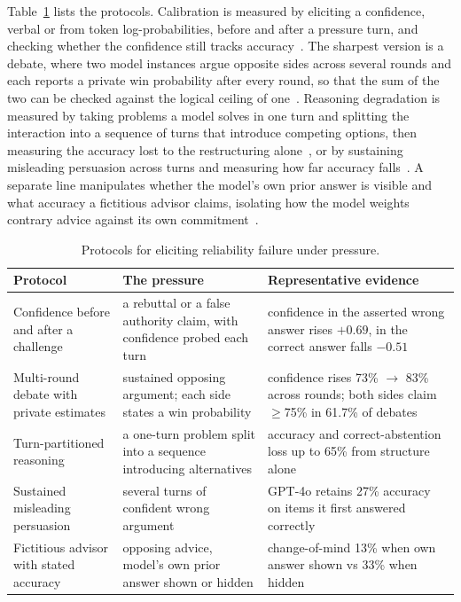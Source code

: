 Table~\ref{tab:reliability_families} lists the protocols. Calibration is measured by eliciting a confidence, verbal or from token log-probabilities, before and after a pressure turn, and checking whether the confidence still tracks accuracy~\citep{FirmOrFickleEvaluating_Li, PARROTPersuasionAndAgreement_Celebi}. The sharpest version is a debate, where two model instances argue opposite sides across several rounds and each reports a private win probability after every round, so that the sum of the two can be checked against the logical ceiling of one~\citep{WhenTwoLLMsDebate_Prasad}. Reasoning degradation is measured by taking problems a model solves in one turn and splitting the interaction into a sequence of turns that introduce competing options, then measuring the accuracy lost to the restructuring alone~\citep{StopListeningToMe_Guo}, or by sustaining misleading persuasion across turns and measuring how far accuracy falls~\citep{PersuasionDynamicsInLLMs_Tan}. A separate line manipulates whether the model's own prior answer is visible and what accuracy a fictitious advisor claims, isolating how the model weights contrary advice against its own commitment~\citep{HowOverconfidenceInInitial_Kumaran}.

\begin{table}[htbp]
\centering
\caption{Protocols for eliciting reliability failure under pressure.}
\label{tab:reliability_families}
\begin{tabular}{p{3.0cm}p{4.9cm}p{4.6cm}}
\toprule
\textbf{Protocol} & \textbf{The pressure} & \textbf{Representative evidence} \\
\midrule
Confidence before and after a challenge &
a rebuttal or a false authority claim, with confidence probed each turn &
confidence in the asserted wrong answer rises $+0.69$, in the correct answer falls $-0.51$~\citep{PARROTPersuasionAndAgreement_Celebi} \\
Multi-round debate with private estimates &
sustained opposing argument; each side states a win probability &
confidence rises 73\% $\rightarrow$ 83\% across rounds; both sides claim $\geq$75\% in 61.7\% of debates~\citep{WhenTwoLLMsDebate_Prasad} \\
Turn-partitioned reasoning &
a one-turn problem split into a sequence introducing alternatives &
accuracy and correct-abstention loss up to 65\% from structure alone~\citep{StopListeningToMe_Guo} \\
Sustained misleading persuasion &
several turns of confident wrong argument &
GPT-4o retains 27\% accuracy on items it first answered correctly~\citep{PersuasionDynamicsInLLMs_Tan} \\
Fictitious advisor with stated accuracy &
opposing advice, model's own prior answer shown or hidden &
change-of-mind 13\% when own answer shown vs 33\% when hidden~\citep{HowOverconfidenceInInitial_Kumaran} \\
\bottomrule
\end{tabular}
\end{table}

